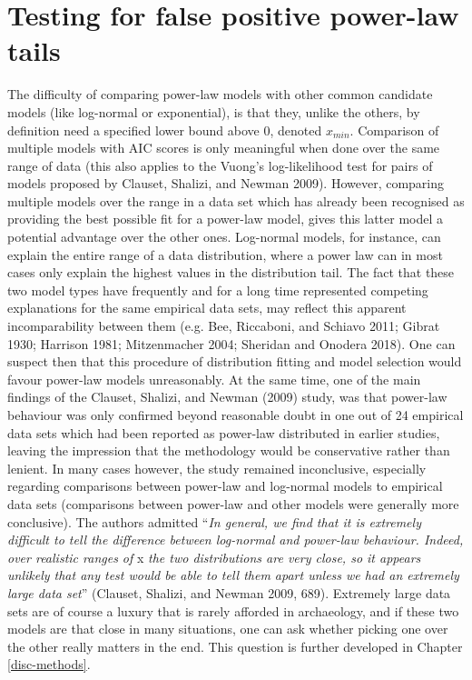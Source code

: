 \documentclass[
  12pt,
  a4paper, twoside]{book}
\begin{document}
\hypertarget{testing-for-false-positive-power-law-tails}{%
\section{Testing for false positive power-law tails}\label{testing-for-false-positive-power-law-tails}}

The difficulty of comparing power-law models with other common candidate models (like log-normal or exponential), is that they, unlike the others, by definition need a specified lower bound above 0, denoted \(x_{min}\). Comparison of multiple models with AIC scores is only meaningful when done over the same range of data (this also applies to the Vuong's log-likelihood test for pairs of models proposed by Clauset, Shalizi, and Newman 2009). However, comparing multiple models over the range in a data set which has already been recognised as providing the best possible fit for a power-law model, gives this latter model a potential advantage over the other ones. Log-normal models, for instance, can explain the entire range of a data distribution, where a power law can in most cases only explain the highest values in the distribution tail. The fact that these two model types have frequently and for a long time represented competing explanations for the same empirical data sets, may reflect this apparent incomparability between them (e.g. Bee, Riccaboni, and Schiavo 2011; Gibrat 1930; Harrison 1981; Mitzenmacher 2004; Sheridan and Onodera 2018). One can suspect then that this procedure of distribution fitting and model selection would favour power-law models unreasonably. At the same time, one of the main findings of the Clauset, Shalizi, and Newman (2009) study, was that power-law behaviour was only confirmed beyond reasonable doubt in one out of 24 empirical data sets which had been reported as power-law distributed in earlier studies, leaving the impression that the methodology would be conservative rather than lenient. In many cases however, the study remained inconclusive, especially regarding comparisons between power-law and log-normal models to empirical data sets (comparisons between power-law and other models were generally more conclusive). The authors admitted ``\emph{In general, we find that it is extremely difficult to tell the difference between log-normal and power-law behaviour. Indeed, over realistic ranges of} x \emph{the two distributions are very close, so it appears unlikely that any test would be able to tell them apart unless we had an extremely large data set}'' (Clauset, Shalizi, and Newman 2009, 689). Extremely large data sets are of course a luxury that is rarely afforded in archaeology, and if these two models are that close in many situations, one can ask whether picking one over the other really matters in the end. This question is further developed in Chapter \ref{disc-methods}.
\end{document}
